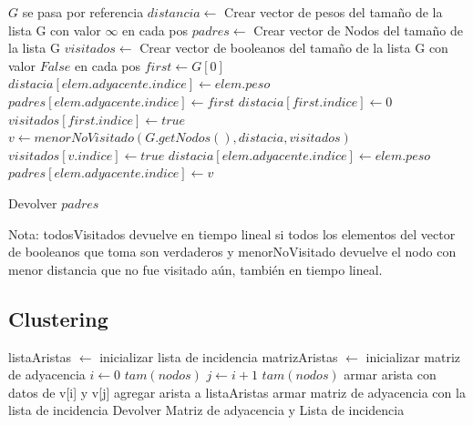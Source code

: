 \documentclass[11pt,a4paper]{article}
\begin{document}
\begin{codebox}
\li \Comment $G$ se pasa por referencia
\li $distancia \gets$ Crear vector de pesos del tamaño de la lista G con valor $\infty$ en cada pos
\li $padres \gets$ Crear vector de Nodos del tamaño de la lista G
\li $visitados \gets$ Crear vector de booleanos del tamaño de la lista G con valor $False$ en cada pos
\li $first \gets G[0]$
\li 
\li {} \Do 
\li		$distacia[elem.adyacente.indice] \gets elem.peso$
\li 	$padres[elem.adyacente.indice] \gets first$
	\End
\li 
\li $distacia[first.indice] \gets 0$
\li $visitados[first.indice] \gets true$
\li 
\li {} \Do 
\li 	$v \gets menorNoVisitado(G.getNodos(), distacia, visitados)$
\li 	$visitados[v.indice] \gets true$
\li 	{} \Do
\li 		{} \Then
\li 			{} \Then
\li 				$distacia[elem.adyacente.indice] \gets elem.peso$
\li 				$padres[elem.adyacente.indice] \gets v$
				\End
			\End
		\End
	\End
 
\li Devolver $padres$
\end{codebox}

Nota: todosVisitados devuelve en tiempo lineal si todos los elementos del vector de booleanos que toma son verdaderos y menorNoVisitado devuelve el nodo con menor distancia que no fue visitado aún, también en tiempo lineal.

\subsection{Clustering}

\begin{codebox}
\li listaAristas $\gets$ inicializar lista de incidencia
\li matrizAristas $\gets$ inicializar matriz de adyacencia
\li
\li \For $i \gets 0$ \To $tam(nodos)$ \Do
\li 		\For  $j \gets i+1$ \To $tam(nodos)$ \Do
					\li armar arista con datos de v[i] y v[j]
					\li agregar arista a listaAristas
				\End
		\End
\li
\li armar matriz de adyacencia con la lista de incidencia
\li Devolver Matriz de adyacencia y Lista de incidencia
\end{codebox}
\end{document}
